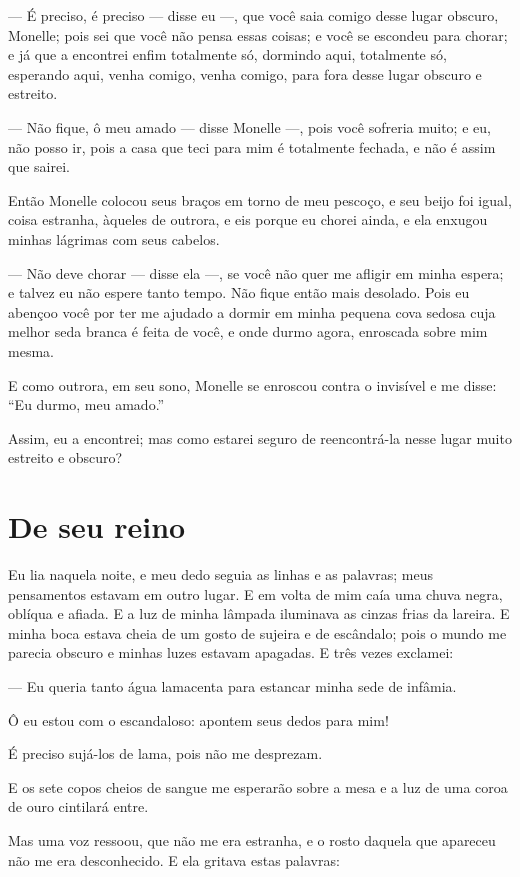 --- É preciso, é preciso --- disse eu ---, que você saia comigo desse lugar
obscuro, Monelle; pois sei que você não pensa essas coisas; e você se
escondeu para chorar; e já que a encontrei enfim totalmente só, dormindo
aqui, totalmente só, esperando aqui, venha comigo, venha comigo, para fora
desse lugar obscuro e estreito.

--- Não fique, ô meu amado --- disse Monelle ---, pois você sofreria muito; e
eu, não posso ir, pois a casa que teci para mim é totalmente fechada, e
não é assim que sairei.

Então Monelle colocou seus braços em torno de meu pescoço, e seu beijo
foi igual, coisa estranha, àqueles de outrora, e eis porque eu chorei
ainda, e ela enxugou minhas lágrimas com seus cabelos.

--- Não deve chorar --- disse ela ---, se você não quer me afligir em minha
espera; e talvez eu não espere tanto tempo. Não fique então mais desolado.
Pois eu abençoo você por ter me ajudado a dormir em minha pequena cova
sedosa cuja melhor seda branca é feita de você, e onde durmo agora,
enroscada sobre mim mesma.

E como outrora, em seu sono, Monelle se enroscou contra o invisível e
me disse: “Eu durmo, meu amado.”

Assim, eu a encontrei; mas como estarei seguro de reencontrá-la nesse
lugar muito estreito e obscuro?

\section{De seu reino}

Eu lia naquela noite, e meu dedo seguia as linhas e as palavras; meus
pensamentos estavam em outro lugar. E em volta de mim caía uma chuva
negra, oblíqua e afiada. E a luz de minha lâmpada iluminava as cinzas
frias da lareira. E minha boca estava cheia de um gosto de sujeira e de
escândalo; pois o mundo me parecia obscuro e minhas luzes estavam
apagadas. E três vezes exclamei:

--- Eu queria tanto água lamacenta para estancar minha sede de infâmia.

Ô eu estou com o escandaloso: apontem seus dedos para mim!

É preciso sujá-los de lama, pois não me desprezam.

E os sete copos cheios de sangue me esperarão sobre a mesa e a luz de
uma coroa de ouro cintilará entre.

Mas uma voz ressoou, que não me era estranha, e o rosto daquela que
apareceu não me era desconhecido. E ela gritava estas palavras:

